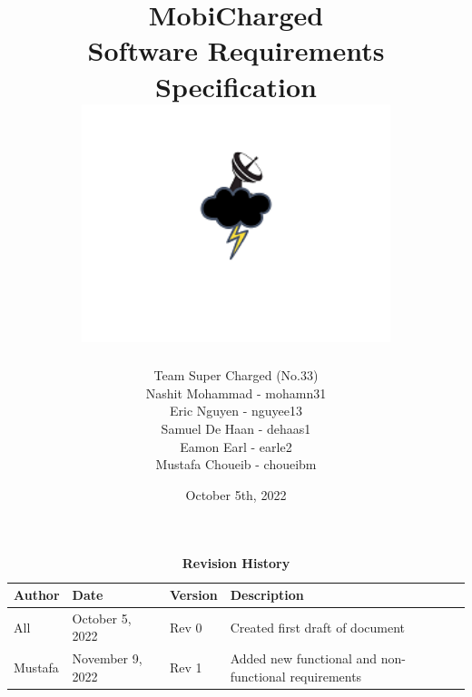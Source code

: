 \documentclass[12pt, titlepage]{article}
\begin{document}
\title{
    MobiCharged\\Software Requirements Specification
    \includegraphics[width=9cm]{images/mobicharged.png} 
}
\author{Team Super Charged (No.33)
		\\ Nashit Mohammad - mohamn31
		\\ Eric Nguyen - nguyee13
		\\ Samuel De Haan - dehaas1
		\\ Eamon Earl - earle2
		\\ Mustafa Choueib - choueibm
}
    

\date{October 5th, 2022}


\maketitle

\tableofcontents
\listoffigures
\listoftables

\vspace{20pt}
\begin{center}
\begin{table}[H]
\caption{\bf Revision History}
    \begin{tabular}{p{2cm}p{3cm}p{2cm}p{6cm}}
    \hline
    \bf Author & \bf Date & \bf Version & \bf Description\\
    \hline
    All & October 5, 2022 & Rev 0 & Created first draft of document\\
    \hline
    Mustafa & November 9, 2022 & Rev 1 & Added new functional and non-functional requirements\\
    \hline
    \end{tabular}
\end{table}
\end{center}

\newpage

\end{document}
